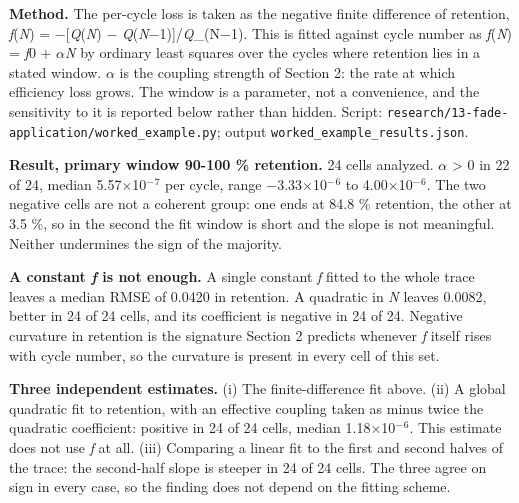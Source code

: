 \documentclass[11pt,a4paper]{article}
\begin{document}
\textbf{Method.} The per-cycle loss is taken as the negative finite difference of retention, \emph{f}(\emph{N}) = \ensuremath{-}[\emph{Q}(\emph{N}) \ensuremath{-} \emph{Q}(\emph{N}\ensuremath{-}1)]/\emph{Q}\_(N\ensuremath{-}1). This is fitted against cycle number as \emph{f}(\emph{N}) = \emph{f}0 + \ensuremath{\alpha}\emph{N} by ordinary least squares over the cycles where retention lies in a stated window. \ensuremath{\alpha} is the coupling strength of Section 2: the rate at which efficiency loss grows. The window is a parameter, not a convenience, and the sensitivity to it is reported below rather than hidden. Script: \texttt{research/13-}\hspace{0pt}\texttt{fade-}\hspace{0pt}\texttt{application/}\hspace{0pt}\texttt{worked\_}\hspace{0pt}\texttt{example.py}; output \texttt{worked\_}\hspace{0pt}\texttt{example\_}\hspace{0pt}\texttt{results.json}.


\textbf{Result, primary window 90-100 \% retention.} 24 cells analyzed. \ensuremath{\alpha} > 0 in 22 of 24, median 5.57\ensuremath{\times}10\ensuremath{^{-}}\ensuremath{^{7}} per cycle, range \ensuremath{-}3.33\ensuremath{\times}10\ensuremath{^{-}}\ensuremath{^{6}} to 4.00\ensuremath{\times}10\ensuremath{^{-}}\ensuremath{^{6}}. The two negative cells are not a coherent group: one ends at 84.8 \% retention, the other at 3.5 \%, so in the second the fit window is short and the slope is not meaningful. Neither undermines the sign of the majority.


\textbf{A constant \emph{f} is not enough.} A single constant \emph{f} fitted to the whole trace leaves a median RMSE of 0.0420 in retention. A quadratic in \emph{N} leaves 0.0082, better in 24 of 24 cells, and its coefficient is negative in 24 of 24. Negative curvature in retention is the signature Section 2 predicts whenever \emph{f} itself rises with cycle number, so the curvature is present in every cell of this set.


\textbf{Three independent estimates.} (i) The finite-difference fit above. (ii) A global quadratic fit to retention, with an effective coupling taken as minus twice the quadratic coefficient: positive in 24 of 24 cells, median 1.18\ensuremath{\times}10\ensuremath{^{-}}\ensuremath{^{6}}. This estimate does not use \emph{f} at all. (iii) Comparing a linear fit to the first and second halves of the trace: the second-half slope is steeper in 24 of 24 cells. The three agree on sign in every case, so the finding does not depend on the fitting scheme.
\end{document}

